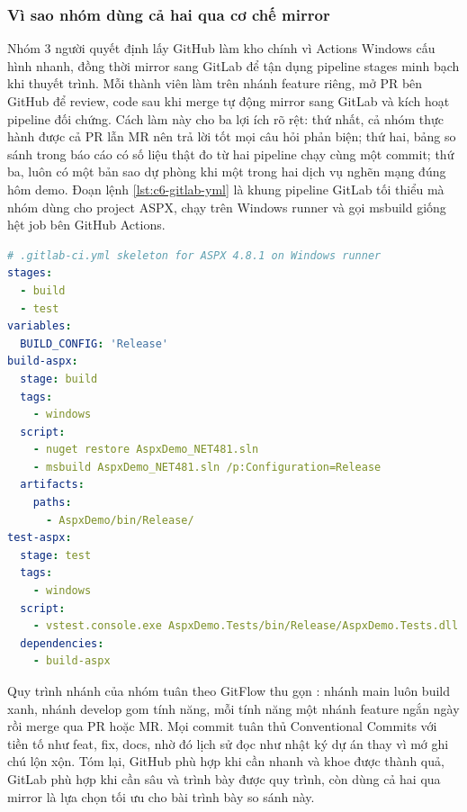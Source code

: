 \subsubsection{Vì sao nhóm dùng cả hai qua cơ chế mirror}

Nhóm 3 người quyết định lấy GitHub làm kho chính vì Actions Windows cấu hình nhanh,
đồng thời mirror sang GitLab để tận dụng pipeline stages minh bạch khi thuyết trình.
Mỗi thành viên làm trên nhánh feature riêng, mở PR bên GitHub để review,
code sau khi merge tự động mirror sang GitLab và kích hoạt pipeline đối chứng.
Cách làm này cho ba lợi ích rõ rệt: thứ nhất, cả nhóm thực hành được cả PR lẫn MR
nên trả lời tốt mọi câu hỏi phản biện; thứ hai, bảng so sánh trong báo cáo có số liệu thật
đo từ hai pipeline chạy cùng một commit; thứ ba, luôn có một bản sao dự phòng
khi một trong hai dịch vụ nghẽn mạng đúng hôm demo.
Đoạn lệnh \ref{lst:c6-gitlab-yml} là khung pipeline GitLab tối thiểu mà nhóm dùng cho project ASPX,
chạy trên Windows runner và gọi msbuild giống hệt job bên GitHub Actions.

\begin{lstlisting}[language=yaml,caption={Khung pipeline GitLab toi thieu build ASPX 4.8.1},label={lst:c6-gitlab-yml}]
# .gitlab-ci.yml skeleton for ASPX 4.8.1 on Windows runner
stages:
  - build
  - test
variables:
  BUILD_CONFIG: 'Release'
build-aspx:
  stage: build
  tags:
    - windows
  script:
    - nuget restore AspxDemo_NET481.sln
    - msbuild AspxDemo_NET481.sln /p:Configuration=Release
  artifacts:
    paths:
      - AspxDemo/bin/Release/
test-aspx:
  stage: test
  tags:
    - windows
  script:
    - vstest.console.exe AspxDemo.Tests/bin/Release/AspxDemo.Tests.dll
  dependencies:
    - build-aspx
\end{lstlisting}

Quy trình nhánh của nhóm tuân theo GitFlow thu gọn \cite{gitflow}:
nhánh main luôn build xanh, nhánh develop gom tính năng,
mỗi tính năng một nhánh feature ngắn ngày rồi merge qua PR hoặc MR.
Mọi commit tuân thủ Conventional Commits \cite{convcommits} với tiền tố như feat, fix, docs,
nhờ đó lịch sử đọc như nhật ký dự án thay vì mớ ghi chú lộn xộn.
Tóm lại, GitHub phù hợp khi cần nhanh và khoe được thành quả,
GitLab phù hợp khi cần sâu và trình bày được quy trình,
còn dùng cả hai qua mirror là lựa chọn tối ưu cho bài trình bày so sánh này.
